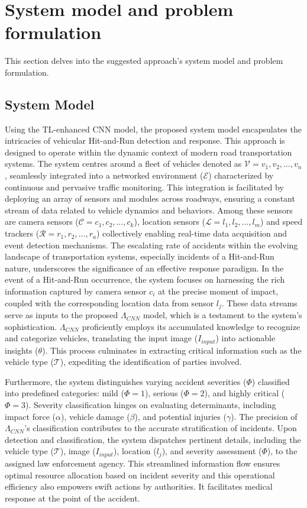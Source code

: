 \documentclass[10pt, conference, a4paper, compsocconf]{IEEEtran}
\begin{document}
\section{System model and problem formulation}
This section delves into the suggested approach's system model and problem formulation.
\subsection{System Model}
Using the TL-enhanced CNN model, the proposed system model encapsulates the intricacies of vehicular Hit-and-Run detection and response. This approach is designed to operate within the dynamic context of modern road transportation systems. The system centres around a fleet of vehicles denoted as $\mathcal{V} = {v_{1}, v_{2}, \ldots, v_{n}}$, seamlessly integrated into a networked environment ($\mathcal{E}$) characterized by continuous and pervasive traffic monitoring. This integration is facilitated by deploying an array of sensors and modules across roadways, ensuring a constant stream of data related to vehicle dynamics and behaviors. Among these sensors are camera sensors ($\mathcal{C} = {c_{1}, c_{2}, \ldots, c_{k}}$), location sensors ($\mathcal{L} = {l_{1}, l_{2}, \ldots, l_{m}}$) and speed trackers ($\mathcal{R} = {r_{1},r_{2}, \ldots, r_{a}}$) collectively enabling real-time data acquisition and event detection mechanisms. The escalating rate of accidents within the evolving landscape of transportation systems, especially incidents of a Hit-and-Run nature, underscores the significance of an effective response paradigm. In the event of a Hit-and-Run occurrence, the system focuses on harnessing the rich information captured by camera sensor $c_{i}$ at the precise moment of impact, coupled with the corresponding location data from sensor $l_{j}$. These data streams serve as inputs to the proposed $\Lambda_{CNN}$ model, which is a testament to the system's sophistication. $\Lambda_{CNN}$ proficiently employs its accumulated knowledge to recognize and categorize vehicles, translating the input image ($I_{input}$) into actionable insights ($\theta$). This process culminates in extracting critical information such as the vehicle type ($\mathcal{T}$), expediting the identification of parties involved.

\indent Furthermore, the system distinguishes varying accident severities ($\Phi$) classified into predefined categories: mild ($\Phi = 1$), serious ($\Phi = 2$), and highly critical ($\Phi = 3$). Severity classification hinges on evaluating determinants, including impact force ($\alpha$), vehicle damage ($\beta$), and potential injuries ($\gamma$). The precision of $\Lambda_{CNN}$'s classification contributes to the accurate stratification of incidents. Upon detection and classification, the system dispatches pertinent details, including the vehicle type ($\mathcal{T}$), image ($I_{input}$), location ($l_{j}$), and severity assessment ($\Phi$), to the assigned law enforcement agency. This streamlined information flow ensures optimal resource allocation based on incident severity and this operational efficiency also empowers swift actions by authorities. It facilitates medical response at the point of the accident.
\end{document}

